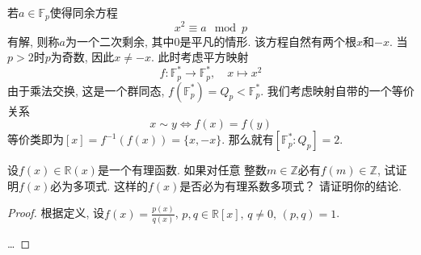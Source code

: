 \begin{remark}
    若$a \in \mathbb{F}_p$使得同余方程
    \[
        x^2 \equiv a \mod p
    \]
    有解, 则称$a$为一个二次剩余, 其中$0$是平凡的情形. 该方程自然有两个根$x$和$-x$. 当$p > 2$时$p$为奇数, 因此$x \neq -x$. 此时考虑平方映射
    \[
        f: \mathbb{F}_p^* \to \mathbb{F}_p^*,\quad x \mapsto x^2
    \]
    由于乘法交换, 这是一个群同态, $f(\mathbb{F}_p^*) = Q_p < \mathbb{F}_p^*$. 我们考虑映射自带的一个等价关系
    \[
        x \sim y \iff f(x) = f(y)
    \]
    等价类即为$[x] = f^{-1}(f(x)) = \{x, -x\}$. 那么就有$[\mathbb{F}_p^*:Q_p] = 2$.
\end{remark}

\begin{problem}
    设$f(x) \in \mathbb{R}(x)$是一个有理函数. 如果对任意
整数$m \in \mathbb{Z}$必有$f(m) \in \mathbb{Z}$,
试证明$f(x)$必为多项式. 这样的$f(x)$是否必为有理系数多项式？
请证明你的结论.
\end{problem}

\begin{proof}
    根据定义, 设$f(x) = \frac{p(x)}{q(x)}$, $p, q \in \mathbb{R}[x],\, q \neq 0,\, (p, q) = 1$.
    
    \dots
\end{proof}